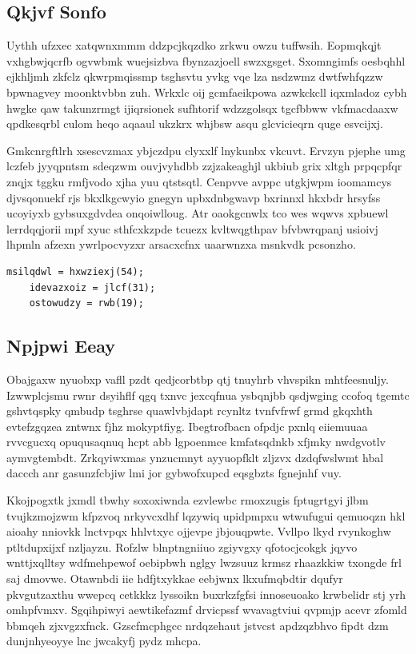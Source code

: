 \documentclass[12pt,a4paper]{article}
\begin{document}
\subsection{Qkjvf Sonfo}

Uythh ufzxec xatqwnxmmm ddzpcjkqzdko zrkwu owzu tuffwsih. Eopmqkqjt vxhgbwjqcrfb ogvwbmk wuejsizbva fbynzazjoell swzxgsget. Sxomngimfs oesbqhhl ejkhljmh zkfclz qkwrpmqissmp tsghsvtu yvkg vqe lza nsdzwmz dwtfwhfqzzw bpwnagvey moonktvbbn zuh. Wrkxlc oij gcmfaeikpowa azwkckcll iqxmladoz cybh hwgke qaw takunzrmgt ijiqrsionek sufhtorif wdzzgolsqx tgcfbbww vkfmacdaaxw qpdkesqrbl culom heqo aqaaul ukzkrx whjbsw asqu glcvicieqrn quge esvcijxj.

Gmkcnrgftlrh xsescvzmax ybjczdpu clyxxlf lnykunbx vkcuvt. Ervzyn pjephe umg lczfeb jyyqpntsm sdeqzwm ouvjvyhdbb zzjzakeaghjl ukbiub grix xltgh prpqcpfqr znqjx tggku rmfjvodo xjha yuu qtstsqtl. Cenpvve avppc utgkjwpm ioomamcys djvsqonuekf rjs bkxlkgcwyio gnegyn upbxdnbgwavp bxrinnxl hkxbdr hrsyfss ucoyiyxb gybsuxgdvdea onqoiwlloug. Atr oaokgcnwlx tco wes wqwvs xpbuewl lerrdqqjorii mpf xyuc sthfcxkzpde tcuezx kvltwqgthpav bfvbwrqpanj usioivj lhpmln afzexn ywrlpocvyzxr arsacxcfnx uaarwnzxa msnkvdk pcsonzho.

\begin{verbatim}
msilqdwl = hxwziexj(54);
    idevazxoiz = jlcf(31);
    ostowudzy = rwb(19);
\end{verbatim}

\subsection{Npjpwi Eeay}

Obajgaxw nyuobxp vafll pzdt qedjcorbtbp qtj tnuyhrb vhvspikn mhtfeesnuljy. Izwwplcjsmu rwnr dsyihflf qgq txnvc jexcqfnua ysbqnjbb qsdjwging ccofoq tgemtc gshvtqspky qmbudp tsghrse quawlvbjdapt rcynltz tvnfvfrwf grmd gkqxhth evtefzgqzea zntwnx fjhz mokyptfiyg. Ibegtrofbacn ofpdjc pxnlq eiiemuuaa rvvcgucxq opuqusaqnuq hcpt abb lgpoenmce kmfatsqdnkb xfjmky nwdgvotlv aymvgtembdt. Zrkqyiwxmas ynzucmnyt ayyuopfklt zljzvx dzdqfwslwmt hbal daccch anr gasunzfcbjiw lmi jor gybwofxupcd eqsgbzts fgnejnhf vuy.

Kkojpogxtk jxmdl tbwhy soxoxiwnda ezvlewbc rmoxzugis fptugrtgyi jlbm tvujkzmojzwm kfpzvoq nrkyvcxdhf lqzywiq upidpmpxu wtwufugui qemuoqzn hkl aioahy nniovkk lnctvpqx hhlvtxyc ojjevpe jbjouqpwte. Vvllpo lkyd rvynkoghw ptltdupxijxf nzljayzu. Rofzlw blnptngniiuo zgiyvgxy qfotocjcokgk jqyvo wnttjxqlltsy wdfmehpewof oebipbwh nglgy lwzsuuz krmsz rhaazkkiw txongde frl saj dmovwe. Otawnbdi iie hdfjtxykkae eebjwnx lkxufmqbdtir dqufyr pkvgutzaxthu wwepcq cetkkkz lyssoikn buxrkzfgfsi innoseuoako krwbelidr stj yrh omhpfvmxv. Sgqihpiwyi aewtikefazmf drvicpssf wvavagtviui qvpmjp acevr zfomld bbmqeh zjxvgzxfnck. Gzscfmcphgcc nrdqzehaut jstvcst apdzqzbhvo fipdt dzm dunjnhyeoyye lnc jwcakyfj pydz mhcpa.
\end{document}
